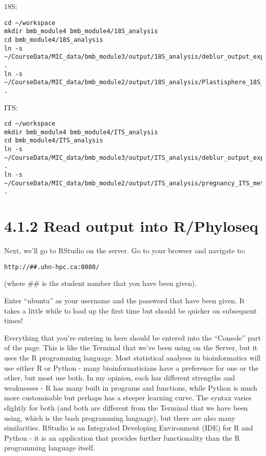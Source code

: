 \documentclass[
]{book}
\begin{document}
18S:

\begin{verbatim}
cd ~/workspace
mkdir bmb_module4 bmb_module4/18S_analysis
cd bmb_module4/18S_analysis
ln -s ~/CourseData/MIC_data/bmb_module3/output/18S_analysis/deblur_output_exported/ .
ln -s ~/CourseData/MIC_data/bmb_module2/output/18S_analysis/Plastisphere_18S_metadata.tsv .
\end{verbatim}

ITS:

\begin{verbatim}
cd ~/workspace
mkdir bmb_module4 bmb_module4/ITS_analysis
cd bmb_module4/ITS_analysis
ln -s ~/CourseData/MIC_data/bmb_module3/output/ITS_analysis/deblur_output_exported/ .
ln -s ~/CourseData/MIC_data/bmb_module2/output/ITS_analysis/pregnancy_ITS_metadata.tsv .
\end{verbatim}

\section{4.1.2 Read output into R/Phyloseq}\label{read-output-into-rphyloseq}

Next, we'll go to RStudio on the server. Go to your browser and navigate to:

\begin{verbatim}
http://##.uhn-hpc.ca:8080/
\end{verbatim}

(where \#\# is the student number that you have been given).

Enter ``ubuntu'' as your username and the password that have been given. It takes a little while to load up the first time but should be quicker on subsequent times!

Everything that you're entering in here should be entered into the ``Console'' part of the page. This is like the Terminal that we've been using on the Server, but it uses the R programming language. Most statistical analyses in bioinformatics will use either R or Python - many bioinformaticians have a preference for one or the other, but most use both. In my opinion, each has different strengths and weaknesses - R has many built in programs and functions, while Python is much more customisable but perhaps has a steeper learning curve. The syntax varies slightly for both (and both are different from the Terminal that we have been using, which is the bash programming language), but there are also many similarities. RStudio is an Integrated Developing Environment (IDE) for R and Python - it is an application that provides further functionality than the R programming language itself.
\end{document}
